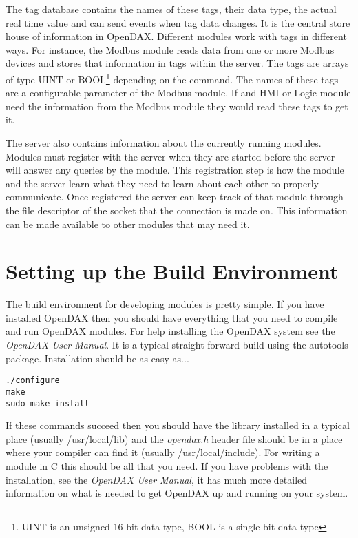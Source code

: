 \documentclass[10pt,letterpaper]{report}
\begin{document}
The tag database contains the names of these tags, their data type, the actual real time value and can send events when tag data changes.  It is the central store house of information in OpenDAX.  Different modules work with tags in different ways.  For instance, the Modbus module reads data from one or more Modbus devices and stores that information in tags within the server.  The tags are arrays of type UINT or BOOL\footnote{UINT is an unsigned 16 bit data type, BOOL is a single bit data type} depending on the command.  The names of these tags are a configurable parameter of the Modbus module.  If and HMI or Logic module need the information from the Modbus module they would read these tags to get it.

The server also contains information about the currently running modules.  Modules must register with the server when they are started before the server will answer any queries by the module.  This registration step is how the module and the server learn what they need to learn about each other to properly communicate.  Once registered the server can keep track of that module through the file descriptor of the socket that the connection is made on.  This information can be made available to other modules that may need it.

\section{Setting up the Build Environment}
The build environment for developing modules is pretty simple.  If you have installed OpenDAX then you should have everything that you need to compile and run OpenDAX modules.  For help installing the OpenDAX system see the \textit{OpenDAX User Manual}. It is a typical straight forward build using the autotools package.  Installation should be as easy as...

\begin{verbatim}
./configure
make
sudo make install
\end{verbatim}

If these commands succeed then you should have the library installed in a typical place (usually /usr/local/lib) and the \textit{opendax.h} header file should be in a place where your compiler can find it (usually /usr/local/include).  For writing a module in C this should be all that you need.  If you have problems with the installation, see the \textit{OpenDAX User Manual}, it has much more detailed information on what is needed to get OpenDAX up and running on your system.
\end{document}
